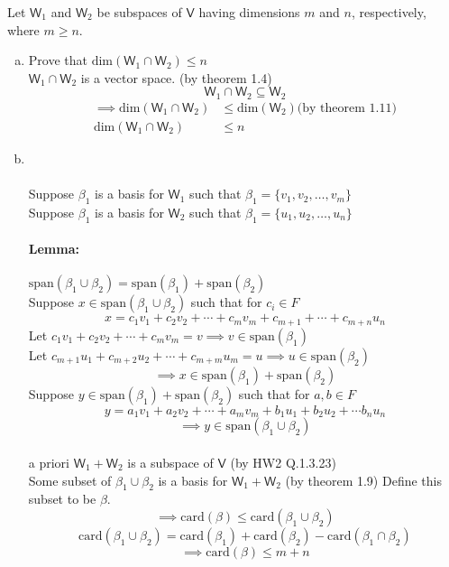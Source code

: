 Let $\mathsf{W}_1$ and $\mathsf{W}_2$ be subspaces of $\mathsf{V}$
having dimensions $m$ and $n$, respectively, where $m\geq n$.
\begin{enumerate}[(a)]
\item Prove that $\text{dim}(\mathsf{W}_1\cap\mathsf{W}_2) \leq n$
\\$\mathsf{W}_1\cap\mathsf{W}_2$ is a vector space. (by theorem 1.4)
\begin{equation}
\mathsf{W}_1\cap\mathsf{W}_2 \subseteq \mathsf{W}_2
\end{equation}
\begin{align}
\implies \text{dim}(\mathsf{W}_1\cap\mathsf{W}_2) &\leq
\text{dim}(\mathsf{W}_2) \text{(by theorem 1.11)}\\
\text{dim}(\mathsf{W}_1\cap\mathsf{W}_2) &\leq n
\end{align}

\item \hfill\\
\\Suppose $\beta_1$ is a basis for $\mathsf{W}_1$ such that
$\beta_1=\{v_1,v_2,\dots,v_m\}$
\\Suppose $\beta_1$ is a basis for $\mathsf{W}_2$ such that
$\beta_1=\{u_1,u_2,\dots,u_n\}$
\paragraph{Lemma:} $\text{span}(\beta_1\cup \beta_2) =
\text{span}(\beta_1) + \text{span}(\beta_2)$
\\Suppose $x\in \text{span}(\beta_1\cup\beta_2)$ such that for $c_i
\in F$ 
\[x=c_1v_1+c_2v_2+\cdots+c_mv_m +c_{m+1} +\cdots+c_{m+n}u_n\]
Let $c_1v_1+c_2v_2+\cdots+c_mv_m = v \implies v \in
\text{span}(\beta_1)$
\\Let $c_{m+1}u_1+c_{m+2}u_2+\cdots+c_{m+m}u_m = u \implies u \in
\text{span}(\beta_2)$
\begin{equation}
\implies x\in \text{span}(\beta_1) + \text{span}(\beta_2)
\end{equation}
Suppose $y\in \text{span}(\beta_1) + \text{span}(\beta_2)$ such that
for $a,b \in F$ 
\[y = a_1v_1+a_2v_2+\cdots+a_mv_m+b_1u_1+b_2u_2+\cdots b_nu_n \]
\begin{equation}
\implies y \in \text{span}(\beta_1\cup\beta_2)
\end{equation}
\\a priori $\mathsf{W}_1+\mathsf{W}_2$ is a subspace of $\mathsf{V}$
(by HW2 Q.1.3.23)
\\Some subset of $\beta_1\cup\beta_2$ is a basis for
$\mathsf{W}_1+\mathsf{W}_2$ (by theorem 1.9) Define this subset to be
$\beta$.
\begin{equation}
\implies \text{card}(\beta) \leq \text{card}(\beta_1\cup\beta_2)
\end{equation}
\begin{equation}
\text{card}(\beta_1\cup\beta_2) = \text{card}(\beta_1) +\text{card}(\beta_2)-\text{card}(\beta_1\cap\beta_2)
\end{equation}
\begin{equation}
\implies \text{card}(\beta) \leq m+n
\end{equation}
\end{enumerate}
